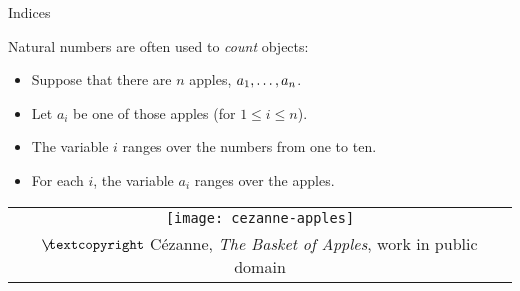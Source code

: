 \begin{frame}{Indices}

Natural numbers are often used to \emph{count} objects:

	\begin{itemize}
	
		\item Suppose that there are $n$ apples, $a_1, \mathellipsis, a_n$.
		
		\item Let $a_i$ be one of those apples (for $1\leq i\leq n$).
		
		\item The variable $i$ ranges over the numbers from one to ten.
		
		\item For each $i$, the variable $a_i$ ranges over the apples.
	
	\end{itemize}
	
	\begin{center}
		\begin{tabular}{c}
		\texttt{[image: cezanne-apples]}\\[-1ex]
		{\tiny $\not\hspace{-1ex}\textcopyright$ C\'ezanne, \emph{The Basket of Apples}, work in public domain}
		\end{tabular}
		\end{center}

\end{frame}


